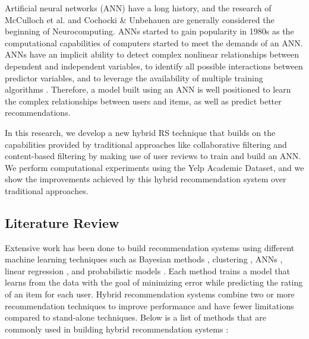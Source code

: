 \documentclass[12pt]{article}
\begin{document}
Artificial neural networks (ANN) have a long history, and the research of McCulloch et al. \cite{mcculloch} and Cochocki \& Unbehauen \cite{cochocki} are generally considered the beginning of Neurocomputing. ANNs started to gain popularity in 1980s \cite{cochocki} as the computational capabilities of computers started to meet the demands of an ANN. ANNs have an implicit ability to detect complex nonlinear relationships between dependent and independent variables, to identify all possible interactions between predictor variables, and to leverage the availability of multiple training algorithms \cite{tu}. Therefore, a model built using an ANN is well positioned to learn the complex relationships between users and items, as well as predict better recommendations.

In this research, we develop a new hybrid RS technique that builds on the capabilities provided by traditional approaches like collaborative filtering and content-based filtering by making use of user reviews to train and build an ANN. We perform computational experiments using the Yelp Academic Dataset, and we show the improvements achieved by this hybrid recommendation system over traditional approaches.

\subsection{Literature Review}

Extensive work has been done to build recommendation systems using different machine learning techniques such as Bayesian methods \cite{guo}, clustering \cite{pham}, ANNs \cite{gunawardana}, linear regression \cite{ge}, and probabilistic models \cite{li}. Each method trains a model that learns from the data with the goal of minimizing error while predicting the rating of an item for each user. Hybrid recommendation systems combine two or more recommendation techniques to improve performance and have fewer limitations compared to stand-alone techniques. Below is a list of methods that are commonly used in building hybrid recommendation systems \cite{burke}:
\end{document}
